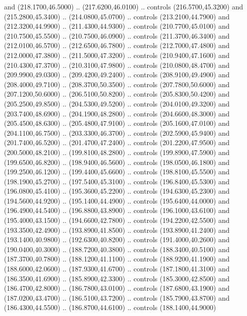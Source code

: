 {\begin{scope}[y=0.80pt, x=0.80pt, yscale=-1, xscale=1, inner sep=0pt, outer sep=0pt, #1]
      and (218.1700,46.5000) .. (217.6200,46.0100) .. controls (216.5700,45.3200)
      and (215.2800,45.3400) .. (214.0800,45.0700) .. controls (213.2100,44.7900)
      and (212.3200,44.9900) .. (211.4300,44.9300) .. controls (210.7700,45.0100)
      and (210.7500,45.5500) .. (210.7500,46.0900) .. controls (211.3700,46.3400)
      and (212.0100,46.5700) .. (212.6500,46.7800) .. controls (212.7000,47.4800)
      and (212.0000,47.3800) .. (211.5000,47.3200) .. controls (210.9400,47.1600)
      and (210.4300,47.3700) .. (210.3100,47.9800) .. controls (210.0800,48.4700)
      and (209.9900,49.0300) .. (209.4200,49.2400) .. controls (208.9100,49.4900)
      and (208.4000,49.7100) .. (208.3700,50.3500) .. controls (207.7800,50.6000)
      and (207.1200,50.6000) .. (206.5100,50.8200) .. controls (205.8300,50.4200)
      and (205.2500,49.8500) .. (204.5300,49.5200) .. controls (204.0100,49.3200)
      and (203.7400,48.6900) .. (204.1900,48.2800) .. controls (204.6600,48.3000)
      and (205.4500,48.6300) .. (205.4800,47.9100) .. controls (205.1600,47.0100)
      and (204.1100,46.7500) .. (203.3300,46.3700) .. controls (202.5900,45.9400)
      and (201.7400,46.5200) .. (201.4700,47.2400) .. controls (201.2200,47.9500)
      and (200.5000,48.2100) .. (199.8100,48.2800) .. controls (199.8900,47.5900)
      and (199.6500,46.8200) .. (198.9400,46.5600) .. controls (198.0500,46.1800)
      and (199.2500,46.1200) .. (199.4400,45.6600) .. controls (198.8100,45.5500)
      and (198.1900,45.2700) .. (197.5400,45.3100) .. controls (196.8400,45.5300)
      and (196.0800,45.4100) .. (195.3600,45.2200) .. controls (194.6300,45.2300)
      and (194.5600,44.9200) .. (195.1400,44.4900) .. controls (195.6400,44.0000)
      and (196.4900,44.5400) .. (196.8800,43.8900) .. controls (196.1000,43.6100)
      and (195.4000,43.1500) .. (194.6600,42.7800) .. controls (194.2200,42.5500)
      and (193.3500,42.4900) .. (193.8900,41.8500) .. controls (193.8900,41.2400)
      and (193.1400,40.9800) .. (192.6300,40.8200) .. controls (191.4000,40.2600)
      and (190.0400,40.3000) .. (188.7200,40.3800) .. controls (188.3400,40.5100)
      and (187.3700,40.7800) .. (188.1200,41.1100) .. controls (188.9200,41.1900)
      and (188.6000,42.0600) .. (187.9300,41.6700) .. controls (187.1800,41.3100)
      and (186.3500,41.6900) .. (185.8900,42.3300) .. controls (185.3000,42.8500)
      and (186.4700,42.8000) .. (186.7800,43.0100) .. controls (187.6800,43.1900)
      and (187.0200,43.4700) .. (186.5100,43.7200) .. controls (185.7900,43.8700)
      and (186.4300,44.5500) .. (186.8700,44.6100) .. controls (188.1400,44.9000)

\end{scope}}

